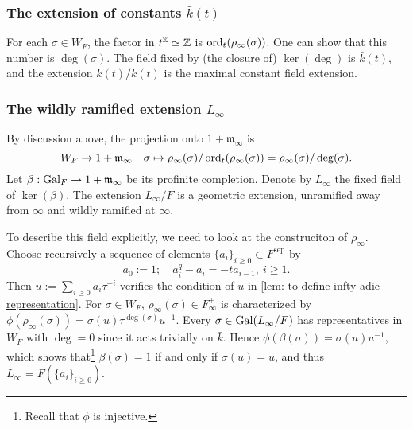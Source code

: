 \documentclass{article}
\newcommand{\sep}{\mathrm{sep}}
\newcommand{\m}{\mathfrak{m}}
\begin{document}
\subsubsection*{The extension of constants \texorpdfstring{$\bar{k}(t)$}{bark(t)}}
For each $\sigma\in W_F$, the factor in $t^{\mathbb{Z}}\simeq \mathbb{Z}$ is
$\operatorname{ord}_{t}(\rho_\infty(\sigma))$.
One can show that this number is $\deg(\sigma)$.
The field fixed by (the closure of) $\ker(\deg)$ is $\bar{k}(t)$,
and the extension $\bar{k}(t)/k(t)$ is the maximal constant field extension.


\subsubsection*{The wildly ramified extension \texorpdfstring{$L_\infty$}{L_\infty}}
By discussion above, the projection onto $1 + \m_\infty$ is
\[W_F\to 1 + \m_\infty\quad \sigma\mapsto \rho_\infty(\sigma)/\ord_t(\rho_\infty(\sigma)) = \rho_\infty(\sigma)/\deg(\sigma).\]
Let $\beta : \gal_F\to 1 + \m_\infty$ be its profinite completion.
Denote by $L_\infty$ the fixed field of $\ker(\beta)$.
The extension $L_\infty/F$ is a geometric extension, unramified away from $\infty$ and wildly ramified at $\infty$.

To describe this field explicitly, we need to look at the construciton of $\rho_\infty$.
Choose recursively a sequence of elements $\{a_i\}_{i\ge 0}\subset F^\sep$ by\[a_0 := 1;\quad a_i^q - a_i = -ta_{i-1},\ i\ge 1.\]
Then $u := \sum_{i\ge 0}a_i\tau^{-i}$ verifies the condition of $u$ in \cref{lem: to define infty-adic representation}.
For $\sigma\in W_F$, $\rho_\infty(\sigma)\in F_\infty^+$ is characterized by $\phi(\rho_\infty(\sigma)) = \sigma(u)\tau^{\deg(\sigma)} u^{-1}$.
Every $\sigma\in\operatorname{Gal}(L_\infty/F)$ has representatives in $W_F$ with $\deg = 0$ since it acts trivially on $\bar{k}$.
Hence $\phi(\beta(\sigma)) = \sigma(u)u^{-1}$,
which shows that\footnote{Recall that $\phi$ is injective.} $\beta(\sigma) = 1$ if and only if $\sigma(u) = u$,
and thus $L_\infty = F\left( \{a_i\}_{i\ge 0} \right)$.


\end{document}
